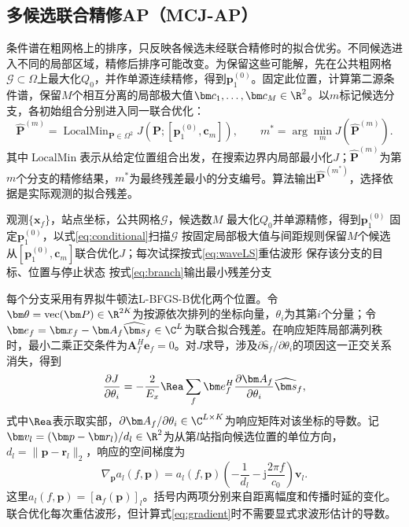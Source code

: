 \subsection{多候选联合精修AP（MCJ-AP）}\label{sec:mcj}
条件谱在粗网格上的排序，只反映各候选未经联合精修时的拟合优劣。不同候选进入不同的局部区域，精修后排序可能改变。为保留这些可能解，先在公共粗网格$\mathcal G\subset\Omega$上最大化$Q_0$，并作单源连续精修，得到$\bm p_1^{(0)}$。固定此位置，计算第二源条件谱，保留$M$个相互分离的局部极大值$\bm c_1,\ldots,\bm c_M\in\R^2$。以$m$标记候选分支，各初始组合分别进入同一联合优化：
\begin{equation}
 \widehat{\bm P}^{(m)}=\operatorname{LocalMin}_{\bm P\in\Omega^2}
 J(\bm P;[\bm p_1^{(0)},\bm c_m]),\qquad
 m^*=\arg\min_m J(\widehat{\bm P}^{(m)}).\label{eq:branch}
\end{equation}
其中$\operatorname{LocalMin}$表示从给定位置组合出发，在搜索边界内局部最小化$J$；$\widehat{\bm P}^{(m)}$为第$m$个分支的精修结果，$m^*$为最终残差最小的分支编号。算法输出$\widehat{\bm P}^{(m^*)}$，选择依据是实际观测的拟合残差。

\begin{algorithm}[H]
\caption{多候选联合精修AP}\label{alg:ap}
\begin{algorithmic}[1]
\Require 观测$\{\bm x_f\}$，站点坐标，公共网格$\mathcal G$，候选数$M$
\State 最大化$Q_0$并单源精修，得到$\bm p_1^{(0)}$
\State 固定$\bm p_1^{(0)}$，以式\eqref{eq:conditional}扫描$\mathcal G$
\State 按固定局部极大值与间距规则保留$M$个候选
  \State 从$[\bm p_1^{(0)},\bm c_m]$联合优化$J$；每次试探按式\eqref{eq:waveLS}重估波形
  \State 保存该分支的目标、位置与停止状态
\EndFor
\State 按式\eqref{eq:branch}输出最小残差分支
\end{algorithmic}
\end{algorithm}

每个分支采用有界拟牛顿法L-BFGS-B优化两个位置\cite{Byrd1995}。令$\bm\theta=\operatorname{vec}(\bm P)\in\R^{2K}$为按源依次排列的坐标向量，$\theta_i$为其第$i$个分量；令$\bm e_f=\bm x_f-\bm A_f\widehat{\bm s}_f\in\C^L$为联合拟合残差。在响应矩阵局部满列秩时，最小二乘正交条件为$\bm A_f^H\bm e_f=0$。对$J$求导，涉及$\partial\widehat{\bm s}_f/\partial\theta_i$的项因这一正交关系消失，得到\cite{GolubPereyra1973}
\begin{equation}
 \frac{\partial J}{\partial\theta_i}
 =-\frac{2}{E_x}\Rea\sum_f
 \bm e_f^H\frac{\partial\bm A_f}{\partial\theta_i}
 \widehat{\bm s}_f,\label{eq:gradient}
\end{equation}
式中$\Rea$表示取实部，$\partial\bm A_f/\partial\theta_i\in\C^{L\times K}$为响应矩阵对该坐标的导数。记$\bm v_l=(\bm p-\bm r_l)/d_l\in\R^2$为从第$l$站指向候选位置的单位方向，$d_l=\|\bm p-\bm r_l\|_2$，响应的空间梯度为
\begin{equation}
 \nabla_{\bm p}a_l(f,\bm p)
 =a_l(f,\bm p)\left(-\frac1{d_l}-\mathrm j\frac{2\pi f}{c_0}\right)\bm v_l.
 \label{eq:responseDerivative}
\end{equation}
这里$a_l(f,\bm p)=[\bm a_f(\bm p)]_l$。括号内两项分别来自距离幅度和传播时延的变化。联合优化每次重估波形，但计算式\eqref{eq:gradient}时不需要显式求波形估计的导数。

